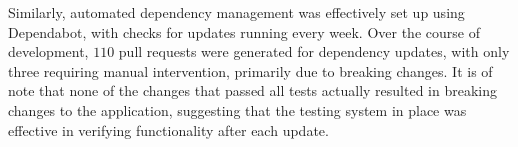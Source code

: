 Similarly, automated dependency management was effectively set up using Dependabot, with checks for updates running every week. Over the course of development, $110$ pull requests were generated for dependency updates, with only three requiring manual intervention, primarily due to breaking changes. It is of note that none of the changes that passed all tests actually resulted in breaking changes to the application, suggesting that the testing system in place was effective in verifying functionality after each update.
